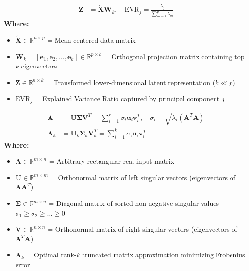 \begin{formulabox}
\begin{align*}
    \mathbf{Z} &= \tilde{\mathbf{X}} \mathbf{W}_k, \quad \text{EVR}_j = \frac{\lambda_j}{\sum_{m=1}^p \lambda_m}
\end{align*}
\textbf{Where:}
\begin{itemize}[noitemsep, topsep=1pt]
    \item $\tilde{\mathbf{X}} \in \mathbb{R}^{n \times p}$ = Mean-centered data matrix
    \item $\mathbf{W}_k = [\mathbf{e}_1, \mathbf{e}_2, \dots, \mathbf{e}_k] \in \mathbb{R}^{p \times k}$ = Orthogonal projection matrix containing top $k$ eigenvectors
    \item $\mathbf{Z} \in \mathbb{R}^{n \times k}$ = Transformed lower-dimensional latent representation ($k \ll p$)
    \item $\text{EVR}_j$ = Explained Variance Ratio captured by principal component $j$
\end{itemize}
\end{formulabox}

\begin{formulabox}
\begin{align*}
    \mathbf{A} &= \mathbf{U} \boldsymbol{\Sigma} \mathbf{V}^T = \sum_{i=1}^r \sigma_i \mathbf{u}_i \mathbf{v}_i^T, \quad \sigma_i = \sqrt{\lambda_i(\mathbf{A}^T\mathbf{A})} \\[3pt]
    \mathbf{A}_k &= \mathbf{U}_k \boldsymbol{\Sigma}_k \mathbf{V}_k^T = \sum_{i=1}^k \sigma_i \mathbf{u}_i \mathbf{v}_i^T
\end{align*}
\textbf{Where:}
\begin{itemize}[noitemsep, topsep=1pt]
    \item $\mathbf{A} \in \mathbb{R}^{m \times n}$ = Arbitrary rectangular real input matrix
    \item $\mathbf{U} \in \mathbb{R}^{m \times m}$ = Orthonormal matrix of left singular vectors (eigenvectors of $\mathbf{A}\mathbf{A}^T$)
    \item $\boldsymbol{\Sigma} \in \mathbb{R}^{m \times n}$ = Diagonal matrix of sorted non-negative singular values $\sigma_1 \ge \sigma_2 \ge \dots \ge 0$
    \item $\mathbf{V} \in \mathbb{R}^{n \times n}$ = Orthonormal matrix of right singular vectors (eigenvectors of $\mathbf{A}^T\mathbf{A}$)
    \item $\mathbf{A}_k$ = Optimal rank-$k$ truncated matrix approximation minimizing Frobenius error
\end{itemize}
\end{formulabox}


